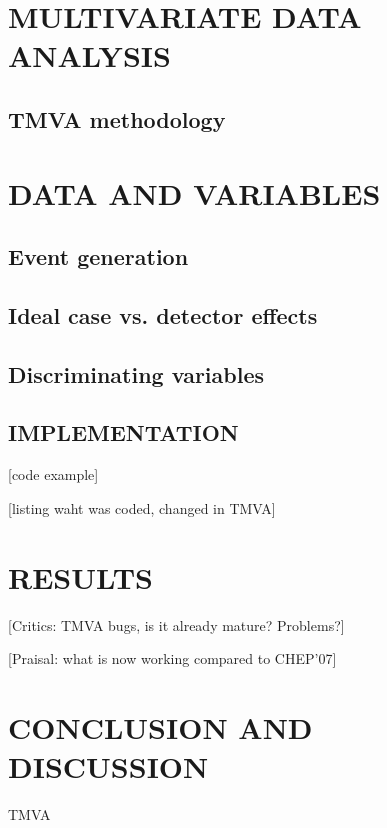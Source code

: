 \documentclass[twoside,floatfix,a4wide]{revtex4}
\begin{document}
\section{MULTIVARIATE DATA ANALYSIS}
\subsection{TMVA methodology}


\section{DATA AND VARIABLES}
\subsection{Event generation}
\subsection{Ideal case vs. detector effects}
\subsection{Discriminating variables}


\subsection{IMPLEMENTATION \label{section:implementation}}
[code example]

[listing waht was coded, changed in TMVA]

\section{RESULTS} \label{sec:example}









[Critics: TMVA bugs, is it already mature? Problems?]

[Praisal: what is now working compared to CHEP'07]

\section{CONCLUSION AND DISCUSSION} \label{sec:conclusion}
TMVA



\end{document}
